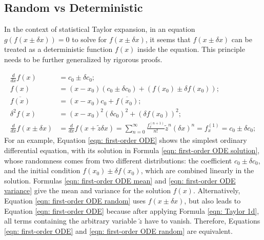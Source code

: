 \documentclass[twoside]{article}
\numberwithin{equation}{section}
\begin{document}
\subsection{Random vs Deterministic}

In the context of statistical Taylor expansion, in an equation $g(f(x \pm \delta x)) = 0$ to solve for $f(x \pm \delta x)$, it seems that $f(x \pm \delta x)$ can be treated as a deterministic function $f(x)$ inside the equation.
This principle needs to be further generalized by rigorous proofs.

\begin{align}
\label{eqn: first-order ODE}
\frac{d}{d x} f(x) &= c_0 \pm \delta c_0; \\
\label{eqn: first-order ODE solution}
f(x) &= (x - x_0) (c_0 \pm \delta c_0) + (f(x_0) \pm \delta f(x_0)); \\
\label{eqn: first-order ODE mean}
\overline{f(x)} &= (x - x_0) c_0 + \overline{f(x_0)}; \\
\label{eqn: first-order ODE variance}
\delta^2 f(x) &= (x - x_0)^2 (\delta c_0)^2 + (\delta f(x_0))^2; \\
\label{eqn: first-order ODE random}
\frac{d}{d x} f(x \pm \delta x) &= \frac{d}{d x} f(x + \tilde{z} \delta x) = \sum_{n=0}^{\infty} \frac{f^{(n + 1)}_x}{n!} \tilde{z}^n (\delta x)^n = f^{(1)}_x = c_0 \pm \delta c_0;
\end{align}
For an example, Equation \eqref{eqn: first-order ODE} shows the simplest ordinary differential equation, with its solution in Formula \eqref{eqn: first-order ODE solution}, whose randomness comes from two different distributions: the coefficient $c_0 \pm \delta c_0$, and the initial condition $f(x_0) \pm \delta f(x_0)$, which are combined linearly in the solution.
Formulas \eqref{eqn: first-order ODE mean} and \eqref{eqn: first-order ODE variance} give the mean and variance for the solution $f(x)$.
Alternatively, Equation \eqref{eqn: first-order ODE random} uses $f(x \pm \delta x)$, but also leads to Equation \eqref{eqn: first-order ODE} because after applying Formula \eqref{eqn: Taylor 1d}, all terms containing the arbitrary variable $\tilde{z}$ have to vanish.
Therefore, Equations \eqref{eqn: first-order ODE} and \eqref{eqn: first-order ODE random} are equivalent.
\end{document}
